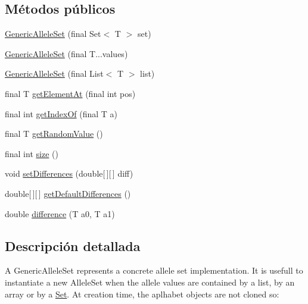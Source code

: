 \subsection*{Métodos públicos}
\begin{DoxyCompactItemize}
\item 
\hyperlink{classjenes_1_1chromosome_1_1_generic_allele_set_3_01_t_01_4_afc6f6f35af245d54ba7ad6f57a9a3893}{Generic\-Allele\-Set} (final Set$<$ T $>$ set)
\item 
\hyperlink{classjenes_1_1chromosome_1_1_generic_allele_set_3_01_t_01_4_ae7a1970427bae039c3f4ae6340b53ca7}{Generic\-Allele\-Set} (final T...\-values)
\item 
\hyperlink{classjenes_1_1chromosome_1_1_generic_allele_set_3_01_t_01_4_a8cbf2394287ce6321fcd338dc4c44a8e}{Generic\-Allele\-Set} (final List$<$ T $>$ list)
\item 
final T \hyperlink{classjenes_1_1chromosome_1_1_generic_allele_set_3_01_t_01_4_acf8f796e2243cc0b745b8d21e45ac7df}{get\-Element\-At} (final int pos)
\item 
final int \hyperlink{classjenes_1_1chromosome_1_1_generic_allele_set_3_01_t_01_4_a9b5dd0079f5d0cb76d2f89e92bde3fa6}{get\-Index\-Of} (final T a)
\item 
final T \hyperlink{classjenes_1_1chromosome_1_1_generic_allele_set_3_01_t_01_4_a2f330d71d992e0d724bc31730b56229e}{get\-Random\-Value} ()
\item 
final int \hyperlink{classjenes_1_1chromosome_1_1_generic_allele_set_3_01_t_01_4_a568ca617716496507d41e348c5bc2845}{size} ()
\item 
void \hyperlink{classjenes_1_1chromosome_1_1_generic_allele_set_3_01_t_01_4_a234b0a286a14fcaf0bf10894813465c5}{set\-Differences} (double\mbox{[}$\,$\mbox{]}\mbox{[}$\,$\mbox{]} diff)
\item 
double\mbox{[}$\,$\mbox{]}\mbox{[}$\,$\mbox{]} \hyperlink{classjenes_1_1chromosome_1_1_generic_allele_set_3_01_t_01_4_a9c24972536c41a2d4660d9cad2694eba}{get\-Default\-Differences} ()
\item 
double \hyperlink{classjenes_1_1chromosome_1_1_generic_allele_set_3_01_t_01_4_ace70b10ee535ccc3a7cbcd42739b8d5c}{difference} (T a0, T a1)
\end{DoxyCompactItemize}


\subsection{Descripción detallada}
A Generic\-Allele\-Set represents a concrete allele set implementation. It is usefull to instantiate a new Allele\-Set when the allele values are contained by a list, by an array or by a \hyperlink{}{Set}. At creation time, the aplhabet objects are not cloned so\-: 

